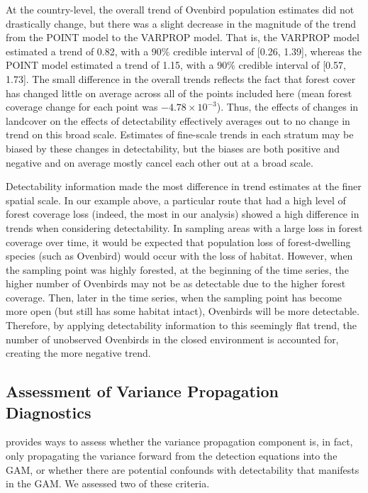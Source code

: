 \par At the country-level, the overall trend of Ovenbird population estimates did not drastically change, but there was a slight decrease in the magnitude of the trend from the POINT model to the VARPROP model.
That is, the VARPROP model estimated a trend of 0.82, with a 90\% credible interval of [0.26, 1.39], whereas the POINT model estimated a trend of 1.15, with a 90\% credible interval of [0.57, 1.73].
The small difference in the overall trends reflects the fact that forest cover has changed little on average across all of the points included here (mean forest coverage change for each point was $-4.78 \times 10^{-3}$).
Thus, the effects of changes in landcover on the effects of detectability effectively averages out to no change in trend on this broad scale.
Estimates of fine-scale trends in each stratum may be biased by these changes in detectability, but the biases are both positive and negative and on average mostly cancel each other out at a broad scale. 

\par Detectability information made the most difference in trend estimates at the finer spatial scale.
In our example above, a particular route that had a high level of forest coverage loss (indeed, the most in our analysis) showed a high difference in trends when considering detectability.
In sampling areas with a large loss in forest coverage over time, it would be expected that population loss of forest-dwelling species (such as Ovenbird) would occur with the loss of habitat.
However, when the sampling point was highly forested, at the beginning of the time series, the higher number of Ovenbirds may not be as detectable due to the higher forest coverage.
Then, later in the time series, when the sampling point has become more open (but still has some habitat intact), Ovenbirds will be more detectable.
Therefore, by applying detectability information to this seemingly flat trend, the number of unobserved Ovenbirds in the closed environment is accounted for, creating the more negative trend.

\subsection{Assessment of Variance Propagation Diagnostics}

\par \citet{bravington_variance_2021} provides ways to assess whether the variance propagation component is, in fact, only propagating the variance forward from the detection equations into the GAM, or whether there are potential confounds with detectability that manifests in the GAM.
We assessed two of these criteria.


